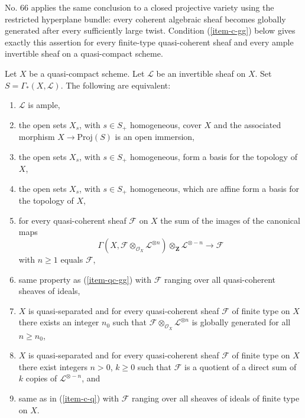 \begin{proposition}
\begin{history}
No. 66 applies the same conclusion to a closed projective variety using the
restricted hyperplane bundle: every coherent algebraic sheaf becomes
globally generated after every sufficiently large twist. Condition
(\ref{item-c-gg}) below gives exactly this assertion for every finite-type
quasi-coherent sheaf and every ample invertible sheaf on a quasi-compact
scheme.
\end{history}
Let $X$ be a quasi-compact scheme.
Let $\mathcal{L}$ be an invertible sheaf on $X$.
Set $S = \Gamma_*(X, \mathcal{L})$.
The following are equivalent:
\begin{enumerate}
\item
\label{item-ample}
$\mathcal{L}$ is ample,
\item
\label{item-immersion}
the open sets $X_s$, with $s \in S_{+}$ homogeneous,
cover $X$ and the associated morphism $X \to \text{Proj}(S)$
is an open immersion,
\item
\label{item-s-basis}
the open sets $X_s$, with $s \in S_{+}$ homogeneous,
form a basis for the topology of $X$,
\item
\label{item-s-affine-basis}
the open sets $X_s$, with $s \in S_{+}$ homogeneous,
which are affine form a basis for the topology of $X$,
\item
\label{item-qc-gg}
for every quasi-coherent sheaf $\mathcal{F}$ on $X$
the sum of the images of the canonical maps
$$
\Gamma(X, \mathcal{F} \otimes_{\mathcal{O}_X} \mathcal{L}^{\otimes n})
\otimes_{\mathbf{Z}} \mathcal{L}^{\otimes -n}
\longrightarrow
\mathcal{F}
$$
with $n \geq 1$ equals $\mathcal{F}$,
\item
\label{item-qc-i-gg}
same property as (\ref{item-qc-gg}) with $\mathcal{F}$
ranging over all quasi-coherent sheaves of ideals,
\item
\label{item-c-gg}
$X$ is quasi-separated and
for every quasi-coherent sheaf $\mathcal{F}$ of finite type on $X$
there exists an integer $n_0$ such that
$\mathcal{F} \otimes_{\mathcal{O}_X} \mathcal{L}^{\otimes n}$
is globally generated for all $n \geq n_0$,
\item
\label{item-c-q}
$X$ is quasi-separated and
for every quasi-coherent sheaf $\mathcal{F}$ of finite type on $X$
there exist integers $n > 0$, $k \geq 0$ such that
$\mathcal{F}$ is a quotient of a direct sum of $k$ copies of
$\mathcal{L}^{\otimes - n}$, and
\item
\label{item-c-i-q}
same as in (\ref{item-c-q}) with $\mathcal{F}$ ranging over all
sheaves of ideals of finite type on $X$.
\end{enumerate}
\end{proposition}

